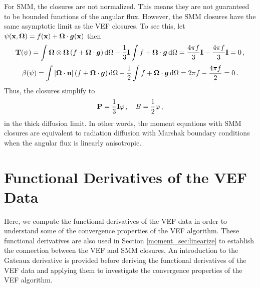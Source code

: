 \documentclass[../doc.tex]{subfiles}
\begin{document}
For SMM, the closures are not normalized. This means they are not guaranteed to be bounded functions of the angular flux. However, the SMM closures have the same asymptotic limit as the VEF closures. 
To see this, let $\psi(\boldsymbol{\mathrm{x}},\boldsymbol{\Omega}) = f(\boldsymbol{\mathrm{x}}) + \boldsymbol{\Omega}\cdot\boldsymbol{g}(\boldsymbol{\mathrm{x}})$ then 
	\begin{equation}
		\boldsymbol{\mathrm{T}}(\psi) = \int \boldsymbol{\Omega}\otimes\boldsymbol{\Omega}\left( f + \boldsymbol{\Omega}\cdot\boldsymbol{g} \right) \mathop{}\!\mathrm{d} \Omega - \frac{1}{3}\boldsymbol{\mathrm{I}} \int f + \boldsymbol{\Omega}\cdot\boldsymbol{g} \mathop{}\!\mathrm{d} \Omega = \frac{4\pi f}{3} \boldsymbol{\mathrm{I}} - \frac{4\pi f}{3} \boldsymbol{\mathrm{I}} = 0 \,, 
	\end{equation}
	\begin{equation}
		\beta(\psi) = \int |\boldsymbol{\Omega}\cdot\boldsymbol{\mathrm{n}}|\left( f + \boldsymbol{\Omega}\cdot\boldsymbol{g} \right) \mathop{}\!\mathrm{d} \Omega - \frac{1}{2}\int f + \boldsymbol{\Omega}\cdot\boldsymbol{g} \mathop{}\!\mathrm{d} \Omega = 2\pi f - \frac{4\pi f}{2} = 0 \,. 
	\end{equation}
Thus, the closures simplify to 
	\begin{equation}
		\boldsymbol{\mathrm{P}} = \frac{1}{3}\boldsymbol{\mathrm{I}} \varphi \,, \quad B = \frac{1}{2}\varphi \,, 
	\end{equation}
in the thick diffusion limit. 
In other words, the moment equations with SMM closures are equivalent to radiation diffusion with Marshak boundary conditions when the angular flux is linearly anisotropic. 

\section{Functional Derivatives of the VEF Data} \label{moment_sec:gateaux}
Here, we compute the functional derivatives of the VEF data in order to understand some of the convergence properties of the VEF algorithm. These functional derivatives are also used in Section \ref{moment_sec:linearize} to establish the connection between the VEF and SMM closures. An introduction to the Gateaux derivative is provided before deriving the functional derivatives of the VEF data and applying them to investigate the convergence properties of the VEF algorithm.  
\end{document}
